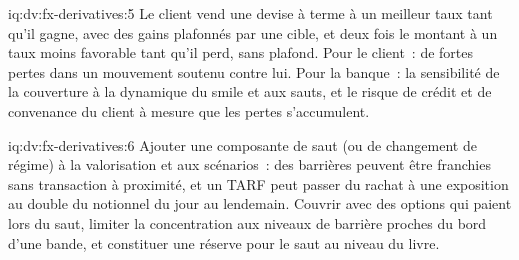 \begin{solution}{iq:dv:fx-derivatives:5}
Le client vend une devise à terme à un meilleur taux tant qu'il gagne, avec des gains plafonnés par une cible, et deux fois le montant à un taux moins favorable tant qu'il perd, sans
plafond. Pour le client~: de fortes pertes dans un mouvement soutenu contre lui. Pour la banque~: la sensibilité de la couverture à la dynamique du smile et aux sauts, et le
risque de crédit et de convenance du client à mesure que les pertes s'accumulent.
\end{solution}

\begin{solution}{iq:dv:fx-derivatives:6}
Ajouter une composante de saut (ou de changement de régime) à la valorisation et aux scénarios~: des barrières peuvent être franchies sans transaction à proximité, et un TARF peut passer du rachat
à une exposition au double du notionnel du jour au lendemain. Couvrir avec des options qui paient lors du saut, limiter la concentration aux niveaux de barrière proches du bord d'une bande, et constituer une réserve pour le
saut au niveau du livre.
\end{solution}
